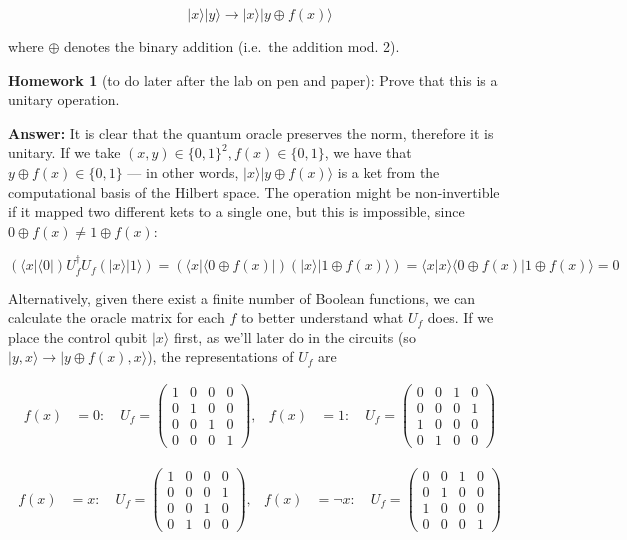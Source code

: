 \documentclass[11pt]{article}
\begin{document}
\[
|x\rangle|y\rangle\to |x\rangle|y\oplus f(x)\rangle
\]

where \(\oplus\) denotes the binary addition (i.e.~the addition mod. 2).

\textbf{Homework 1} (to do later after the
lab on pen and paper): Prove that this is a unitary operation.


\textbf{Answer:} It is clear that the quantum oracle preserves the norm,
therefore it is unitary. If we take
\((x,y)\in\{0,1\}^2, f(x)\in\{0,1\}\), we have that
\(y\oplus f(x)\in\{0,1\}\) --- in other words,
\(|x\rangle|y\oplus f(x)\rangle\) is a ket from the computational basis
of the Hilbert space. The operation might be non-invertible if it mapped
two different kets to a single one, but this is impossible, since
\(0\oplus f(x)\neq 1\oplus f(x)\):

\[
(\langle x|\langle 0|)U_f^\dagger U_f(|x\rangle|1\rangle) =
(\langle x|\langle 0\oplus f(x)|)(|x\rangle|1\oplus f(x)\rangle) = 
\langle x|x\rangle\langle 0\oplus f(x)|1\oplus f(x)\rangle = 0
\]

Alternatively, given there exist a finite number of Boolean functions,
we can calculate the oracle matrix for each \(f\) to better understand
what \(U_f\) does. If we place the control qubit \(|x\rangle\) first, as
we'll later do in the circuits (so
\(|y,x\rangle\rightarrow|y\oplus f(x), x\rangle\)), the representations
of \(U_f\) are

\[
\begin{aligned}
f(x)&=0:\quad
U_f = \begin{pmatrix}
1 & 0 & 0 & 0 \\
0 & 1 & 0 & 0 \\
0 & 0 & 1 & 0 \\
0 & 0 & 0 & 1
\end{pmatrix},
&
f(x)&=1:\quad
U_f = \begin{pmatrix}
0 & 0 & 1 & 0 \\
0 & 0 & 0 & 1 \\
1 & 0 & 0 & 0 \\
0 & 1 & 0 & 0
\end{pmatrix}
\end{aligned}
\]

\[
\begin{aligned}
f(x)&=x: \quad
U_f = \begin{pmatrix}
1 & 0 & 0 & 0 \\
0 & 0 & 0 & 1 \\
0 & 0 & 1 & 0 \\
0 & 1 & 0 & 0
\end{pmatrix},
&
f(x)&=\neg x:\quad
U_f = \begin{pmatrix}
0 & 0 & 1 & 0 \\
0 & 1 & 0 & 0 \\
1 & 0 & 0 & 0 \\
0 & 0 & 0 & 1
\end{pmatrix}
\end{aligned}
\]
\end{document}
